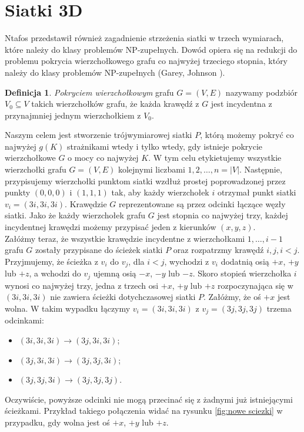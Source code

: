 \documentclass[brudnopis]{xmgr}
\theoremstyle{definition}
\newtheorem{Definicja}{Definicja}
\begin{document}
 \section{Siatki 3D}
 	Ntafos\cite{ntafos} przedstawił również zagadnienie strzeżenia siatki w trzech wymiarach, które należy do klasy problemów NP-zupełnych. Dowód opiera się na redukcji do problemu pokrycia wierzchołkowego grafu co najwyżej trzeciego stopnia, który należy do klasy problemów NP-zupełnych (Garey, Johnson \cite{garey}).
\begin{Definicja}
	\emph{Pokryciem wierzchołkowym} grafu $G = (V,E)$ nazywamy podzbiór $V_0 \subseteq V$ takich wierzchołków grafu, że każda krawędź z $G$ jest incydentna z przynajmniej jednym wierzchołkiem z $V_0$.
\end{Definicja}
Naszym celem jest stworzenie trójwymiarowej siatki $P$, którą możemy pokryć co najwyżej $g(K)$ strażnikami wtedy i tylko wtedy, gdy istnieje pokrycie wierzchołkowe $G$ o mocy co najwyżej $K$.
W tym celu etykietujemy wszystkie wierzchołki grafu $G = (V,E)$ kolejnymi liczbami $1,2,\ldots,n = |V|$. Następnie, przypisujemy wierzchołki punktom siatki wzdłuż prostej poprowadzonej przez punkty $(0,0,0)$ i $(1,1,1)$ tak, aby każdy wierzchołek $i$ otrzymał punkt siatki $v_i = (3i, 3i, 3i)$. Krawędzie $G$ reprezentowane są przez odcinki łączące węzły siatki. Jako że każdy wierzchołek grafu $G$ jest stopnia co najwyżej trzy, każdej incydentnej krawędzi możemy przypisać jeden z kierunków $(x,y,z)$.
\\\indent Załóżmy teraz, że wszystkie krawędzie incydentne z wierzchołkami $1,\ldots,i - 1$ grafu $G$ zostały przypisane do ścieżek siatki $P$ oraz rozpatrzmy krawędź ${i,j}, i < j$. Przyjmujemy, że ścieżka z $v_i$ do $v_j$, dla $i < j$, wychodzi z $v_i$ dodatnią osią $+x$, $+y$ lub $+z$, a wchodzi do $v_j$ ujemną osią $-x$, $-y$ lub $-z$. Skoro stopień wierzchołka $i$ wynosi co najwyżej trzy, jedna z trzech osi $+x$, $+y$ lub $+z$ rozpoczynająca się w $(3i, 3i, 3i)$ nie zawiera ścieżki dotychczasowej siatki $P$. Załóżmy, że oś $+x$ jest wolna. W takim wypadku łączymy $v_i = (3i, 3i, 3i)$ z $v_j = (3j, 3j, 3j)$ trzema odcinkami:
\begin{itemize}
	\item $(3i, 3i, 3i) \rightarrow (3j, 3i, 3i)$;
	\item $(3j, 3i, 3i) \rightarrow (3j, 3j, 3i)$;
	\item $(3j, 3j, 3i) \rightarrow (3j, 3j, 3j)$.
\end{itemize}
Oczywiście, powyższe odcinki nie mogą przecinać się z żadnymi już istniejącymi ścieżkami. Przykład takiego połączenia widać na rysunku \ref{fig:nowe sciezki} w przypadku, gdy wolna jest oś $+x$, $+y$ lub $+z$.
\end{document}
